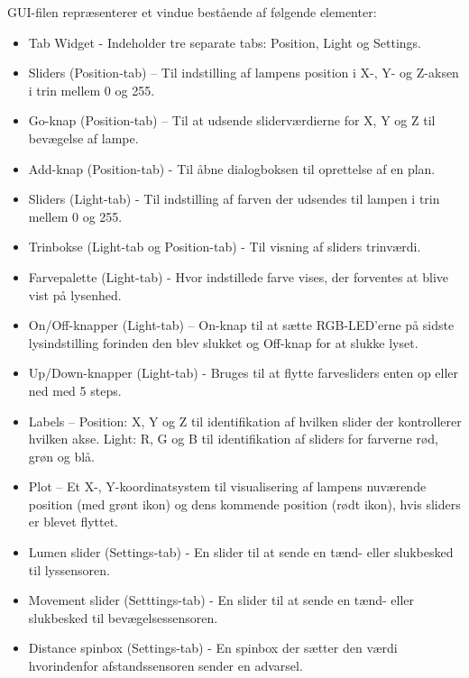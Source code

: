 GUI-filen repræsenterer et vindue bestående af følgende elementer:
\begin{itemize}

\item Tab Widget - Indeholder tre separate tabs: Position, Light og Settings.

\item Sliders (Position-tab) – Til indstilling af lampens position i X-, Y- og Z-aksen i trin mellem 0 og 255.

\item Go-knap (Position-tab) – Til at udsende sliderværdierne for X, Y og Z til bevægelse af lampe.

\item Add-knap (Position-tab) - Til åbne dialogboksen til oprettelse af en plan.

\item Sliders (Light-tab) - Til indstilling af farven der udsendes til lampen i trin mellem 0 og 255.

\item Trinbokse (Light-tab og Position-tab) - Til visning af sliders trinværdi.

\item Farvepalette (Light-tab) - Hvor indstillede farve vises, der forventes at blive vist på lysenhed.

\item On/Off-knapper (Light-tab) – On-knap til at sætte RGB-LED’erne på sidste lysindstilling forinden den blev slukket og Off-knap for at slukke lyset.

\item Up/Down-knapper (Light-tab) - Bruges til at flytte farvesliders enten op eller ned med 5 steps.

\item Labels – Position: X, Y og Z til identifikation af hvilken slider der kontrollerer hvilken akse. Light: R, G og B til identifikation af sliders for farverne rød, grøn og blå.

\item Plot – Et X-, Y-koordinatsystem til visualisering af lampens nuværende position (med grønt ikon) og dens kommende position (rødt ikon), hvis sliders er blevet flyttet.

\item Lumen slider (Settings-tab) - En slider til at sende en tænd- eller slukbesked til lyssensoren.

\item Movement slider (Setttings-tab) - En slider til at sende en tænd- eller slukbesked til bevægelsessensoren.

\item Distance spinbox (Settings-tab) - En spinbox der sætter den værdi hvorindenfor afstandssensoren sender en advarsel.

\end{itemize}


